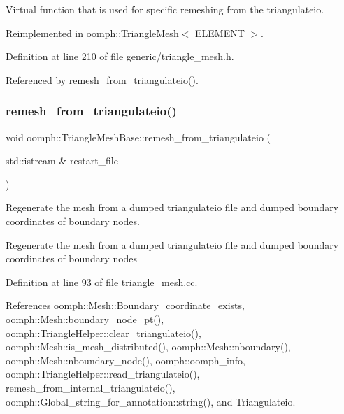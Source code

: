 Virtual function that is used for specific remeshing from the triangulateio. 



Reimplemented in \hyperlink{classoomph_1_1TriangleMesh_a9bc95b0f26f8cd352997d2db32a6a292}{oomph\+::\+Triangle\+Mesh$<$ E\+L\+E\+M\+E\+N\+T $>$}.



Definition at line 210 of file generic/triangle\+\_\+mesh.\+h.



Referenced by remesh\+\_\+from\+\_\+triangulateio().

\mbox{\label{classoomph_1_1TriangleMeshBase_a8e8d7354b213cba989b661f0b748d8b5}} 
\subsubsection{\texorpdfstring{remesh\+\_\+from\+\_\+triangulateio()}{remesh\_from\_triangulateio()}}
{\footnotesize\ttfamily void oomph\+::\+Triangle\+Mesh\+Base\+::remesh\+\_\+from\+\_\+triangulateio (\begin{DoxyParamCaption}\item[{std\+::istream \&}]{restart\+\_\+file }\end{DoxyParamCaption})}



Regenerate the mesh from a dumped triangulateio file and dumped boundary coordinates of boundary nodes. 

Regenerate the mesh from a dumped triangulateio file and dumped boundary coordinates of boundary nodes 

Definition at line 93 of file triangle\+\_\+mesh.\+cc.



References oomph\+::\+Mesh\+::\+Boundary\+\_\+coordinate\+\_\+exists, oomph\+::\+Mesh\+::boundary\+\_\+node\+\_\+pt(), oomph\+::\+Triangle\+Helper\+::clear\+\_\+triangulateio(), oomph\+::\+Mesh\+::is\+\_\+mesh\+\_\+distributed(), oomph\+::\+Mesh\+::nboundary(), oomph\+::\+Mesh\+::nboundary\+\_\+node(), oomph\+::oomph\+\_\+info, oomph\+::\+Triangle\+Helper\+::read\+\_\+triangulateio(), remesh\+\_\+from\+\_\+internal\+\_\+triangulateio(), oomph\+::\+Global\+\_\+string\+\_\+for\+\_\+annotation\+::string(), and Triangulateio.



